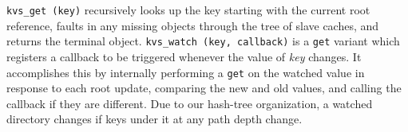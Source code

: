 %
{\tt kvs\_get (key)} recursively looks up the key starting with the
current root reference, faults in any missing objects
through the tree of slave caches, and returns the terminal object.
{\tt kvs\_watch (key, callback)} is a {\tt get} variant which registers a
callback to be triggered whenever the value of {\em key} changes.
It accomplishes this by internally performing a {\tt get} on the watched
value in response to each root update, comparing the new
and old values, and calling the callback if they are different.
Due to our hash-tree organization, a watched directory changes
if keys under it at any path depth change.

%
%
